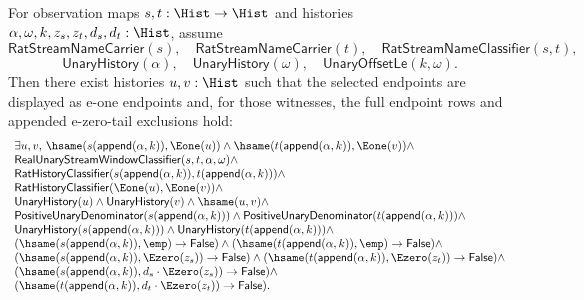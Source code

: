 \begin{theorem}
\label{thm:real-unary-streamname-finite-window-selected-e1-tail-coverage-package}
For observation maps $s,t:\Hist\to\Hist$ and histories
$\alpha,\omega,k,z_s,z_t,d_s,d_t:\Hist$, assume
$$
\mathsf{RatStreamNameCarrier}(s),\quad
\mathsf{RatStreamNameCarrier}(t),\quad
\mathsf{RatStreamNameClassifier}(s,t),
$$
$$
\mathsf{UnaryHistory}(\alpha),\quad
\mathsf{UnaryHistory}(\omega),\quad
\mathsf{UnaryOffsetLe}(k,\omega).
$$
Then there exist histories $u,v:\Hist$ such that the selected endpoints are
displayed as e-one endpoints and, for those witnesses, the full endpoint rows
and appended e-zero-tail exclusions hold:
$$
\begin{array}{l}
\exists u,v,\,
\hsame(s(\mathsf{append}(\alpha,k)),\Eone(u))\land
\hsame(t(\mathsf{append}(\alpha,k)),\Eone(v))\land\\
\mathsf{RealUnaryStreamWindowClassifier}(s,t,\alpha,\omega)\land\\
\mathsf{RatHistoryClassifier}(s(\mathsf{append}(\alpha,k)),t(\mathsf{append}(\alpha,k)))\land\\
\mathsf{RatHistoryClassifier}(\Eone(u),\Eone(v))\land\\
\mathsf{UnaryHistory}(u)\land\mathsf{UnaryHistory}(v)\land\hsame(u,v)\land\\
\mathsf{PositiveUnaryDenominator}(s(\mathsf{append}(\alpha,k)))\land
\mathsf{PositiveUnaryDenominator}(t(\mathsf{append}(\alpha,k)))\land\\
\mathsf{UnaryHistory}(s(\mathsf{append}(\alpha,k)))\land
\mathsf{UnaryHistory}(t(\mathsf{append}(\alpha,k)))\land\\
(\hsame(s(\mathsf{append}(\alpha,k)),\emp)\to\mathsf{False})\land
(\hsame(t(\mathsf{append}(\alpha,k)),\emp)\to\mathsf{False})\land\\
(\hsame(s(\mathsf{append}(\alpha,k)),\Ezero(z_s))\to\mathsf{False})\land
(\hsame(t(\mathsf{append}(\alpha,k)),\Ezero(z_t))\to\mathsf{False})\land\\
(\hsame(s(\mathsf{append}(\alpha,k)),d_s\cdot\Ezero(z_s))\to
\mathsf{False})\land\\
(\hsame(t(\mathsf{append}(\alpha,k)),d_t\cdot\Ezero(z_t))\to
\mathsf{False}).
\end{array}
$$
\end{theorem}
